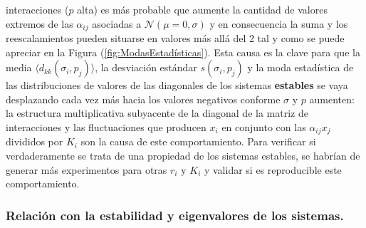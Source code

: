 \documentclass[a4paper,11pt]{book}
\theoremstyle{plain}
\theoremstyle{definition}
\begin{document}
interacciones ($p$ alta) es más probable que aumente la cantidad de valores extremos de las $\alpha_{ij}$ asociadas a $\mathcal{N}(\mu=0,\sigma)$ y en consecuencia la suma y los reescalamientos pueden situarse en valores más allá del 2 tal y como se puede apreciar en la Figura (\ref{fig:ModasEstadísticas}). Esta causa es la clave para que la media $\langle d_{kk}(\sigma_i,p_j)\rangle$, la desviación estándar $s(\sigma_i,p_j)$ y la moda estadística de las distribuciones de valores de las diagonales de los sistemas \textbf{estables} se vaya desplazando cada vez más hacia los valores negativos conforme $\sigma$ y $p$ aumenten: la estructura multiplicativa subyacente de la diagonal de la matriz de interacciones y las fluctuaciones que producen $x_i$ en conjunto con las $\alpha_{ij}x_j$ divididos por $K_i$ son la causa de este comportamiento. Para verificar si verdaderamente se trata de una propiedad de los sistemas estables, se habrían de generar más experimentos para otras $r_i$ y $K_i$ y validar si es reproducible este comportamiento. 

\subsubsection*{Relación con la estabilidad y eigenvalores de los sistemas.}
\end{document}
